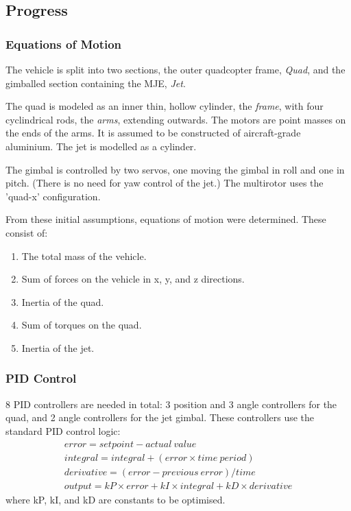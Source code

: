 \documentclass[10pt]{article}
\begin{document}
\subsection{Progress}
\subsubsection{Equations of Motion}
The vehicle is split into two sections, the outer quadcopter frame, \emph{Quad}, and the gimballed section containing the MJE, \emph{Jet}.

The quad is modeled as an inner thin, hollow cylinder, the \emph{frame}, with four cyclindrical rods, the \emph{arms}, extending outwards. The motors are point masses on the ends of the arms. It is assumed to be constructed of aircraft-grade aluminium. The jet is modelled as a cylinder.

The gimbal is controlled by two servos, one moving the gimbal in roll and one in pitch. (There is no need for yaw control of the jet.) The multirotor uses the 'quad-x' configuration.

From these initial assumptions, equations of motion were determined. These consist of:
\begin{enumerate}
    \item The total mass of the vehicle.
    \item Sum of forces on the vehicle in x, y, and z directions.
    \item Inertia of the quad.
    \item Sum of torques on the quad.
    \item Inertia of the jet.
\end{enumerate}

\subsubsection{PID Control}
8 PID controllers are needed in total: 3 position and 3 angle controllers for the quad, and 2 angle controllers for the jet gimbal. These controllers use the standard PID control logic:
\begin{eqnarray*}
    error = setpoint - actual\ value \\
    integral = integral + (error \times time\ period) \\
    derivative = (error - previous\ error)/time \\
    output = kP \times error + kI \times integral + kD \times derivative
\end{eqnarray*}
where kP, kI, and kD are constants to be optimised.
\end{document}
